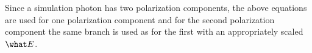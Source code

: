 Since a simulation photon has two polarization components, the above equations are used for one
polarization component and for the second polarization component the same branch is used as for the
first with an appropriately scaled $\what E$.

%
%


